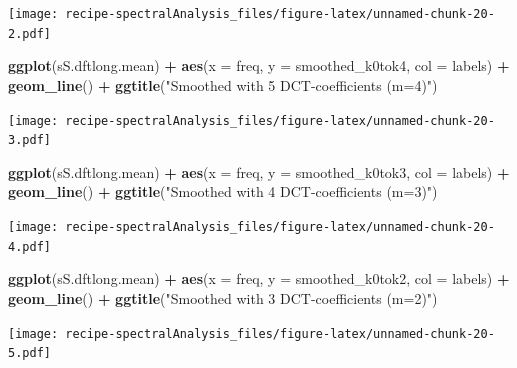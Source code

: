 \documentclass[]{book}
\newenvironment{Shaded}{\begin{snugshade}}{\end{snugshade}}
\newcommand{\DataTypeTok}[1]{\textcolor[rgb]{0.13,0.29,0.53}{#1}}
\newcommand{\KeywordTok}[1]{\textcolor[rgb]{0.13,0.29,0.53}{\textbf{#1}}}
\newcommand{\NormalTok}[1]{#1}
\newcommand{\OperatorTok}[1]{\textcolor[rgb]{0.81,0.36,0.00}{\textbf{#1}}}
\newcommand{\StringTok}[1]{\textcolor[rgb]{0.31,0.60,0.02}{#1}}
\begin{document}
\texttt{[image: recipe-spectralAnalysis\_files/figure-latex/unnamed-chunk-20-2.pdf]}

\begin{Shaded}
\begin{Highlighting}[]
\KeywordTok{ggplot}\NormalTok{(sS.dftlong.mean) }\OperatorTok{+}
\StringTok{  }\KeywordTok{aes}\NormalTok{(}\DataTypeTok{x =}\NormalTok{ freq, }\DataTypeTok{y =}\NormalTok{ smoothed_k0tok4, }\DataTypeTok{col =}\NormalTok{ labels) }\OperatorTok{+}
\StringTok{  }\KeywordTok{geom_line}\NormalTok{() }\OperatorTok{+}
\StringTok{  }\KeywordTok{ggtitle}\NormalTok{(}\StringTok{"Smoothed with 5 DCT-coefficients (m=4)"}\NormalTok{)}
\end{Highlighting}
\end{Shaded}

\texttt{[image: recipe-spectralAnalysis\_files/figure-latex/unnamed-chunk-20-3.pdf]}

\begin{Shaded}
\begin{Highlighting}[]
\KeywordTok{ggplot}\NormalTok{(sS.dftlong.mean) }\OperatorTok{+}
\StringTok{  }\KeywordTok{aes}\NormalTok{(}\DataTypeTok{x =}\NormalTok{ freq, }\DataTypeTok{y =}\NormalTok{ smoothed_k0tok3, }\DataTypeTok{col =}\NormalTok{ labels) }\OperatorTok{+}
\StringTok{  }\KeywordTok{geom_line}\NormalTok{()  }\OperatorTok{+}
\StringTok{  }\KeywordTok{ggtitle}\NormalTok{(}\StringTok{"Smoothed with 4 DCT-coefficients (m=3)"}\NormalTok{)}
\end{Highlighting}
\end{Shaded}

\texttt{[image: recipe-spectralAnalysis\_files/figure-latex/unnamed-chunk-20-4.pdf]}

\begin{Shaded}
\begin{Highlighting}[]
\KeywordTok{ggplot}\NormalTok{(sS.dftlong.mean) }\OperatorTok{+}
\StringTok{  }\KeywordTok{aes}\NormalTok{(}\DataTypeTok{x =}\NormalTok{ freq, }\DataTypeTok{y =}\NormalTok{ smoothed_k0tok2, }\DataTypeTok{col =}\NormalTok{ labels) }\OperatorTok{+}
\StringTok{  }\KeywordTok{geom_line}\NormalTok{()  }\OperatorTok{+}
\StringTok{  }\KeywordTok{ggtitle}\NormalTok{(}\StringTok{"Smoothed with 3 DCT-coefficients (m=2)"}\NormalTok{)}
\end{Highlighting}
\end{Shaded}

\texttt{[image: recipe-spectralAnalysis\_files/figure-latex/unnamed-chunk-20-5.pdf]}
\end{document}
